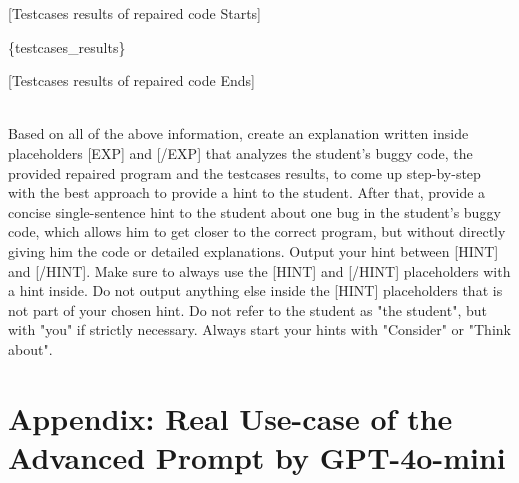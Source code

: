 \documentclass{article}
\begin{document}
\begin{figure*}[h!]
\begin{tcolorbox}[colframe=black!10!white, colback=black!5!white]
\begin{minipage}{\textwidth}
            [Testcases results of repaired code Starts]

            \{testcases\_results\}

            [Testcases results of repaired code Ends]

            \texttt{\\}
            Based on all of the above information, create an explanation written inside placeholders [EXP] and [/EXP] that analyzes the student's buggy code, the provided repaired program and the testcases results, to come up step-by-step with the best approach to provide a hint to the student. After that, provide a concise single-sentence hint to the student about one bug in the student's buggy code, which allows him to get closer to the correct program, but without directly giving him the code or detailed explanations. Output your hint between [HINT] and [/HINT]. Make sure to always use the [HINT] and [/HINT] placeholders with a hint inside. Do not output anything else inside the [HINT] placeholders that is not part of your chosen hint. Do not refer to the student as "the student", but with "you" if strictly necessary. Always start your hints with "Consider" or "Think about".
        \end{minipage}
    \end{tcolorbox}
    \caption{Advanced prompt assigned to the variable \texttt{user\_message\_nus\_hint\_advanced} in \texttt{project\_part1\_prompts.py}, which is used in \ref{I.7} and \ref{I.8}. Notice how CoT prompting is being used by constraining the model to generate a Chain of Thought inside the \texttt{[EXP]} placeholders. Moreover, in order to constrain the kind of hints it should give, the model is constrained to always start its hints with "Consider" or "Think about".}
    \label{fig:advanced-prompt}
\end{figure*}

\clearpage 

\section{Appendix: Real Use-case of the Advanced Prompt by GPT-4o-mini}\label{appendix:real-use-case-gpt4o-mini}
\end{document}
